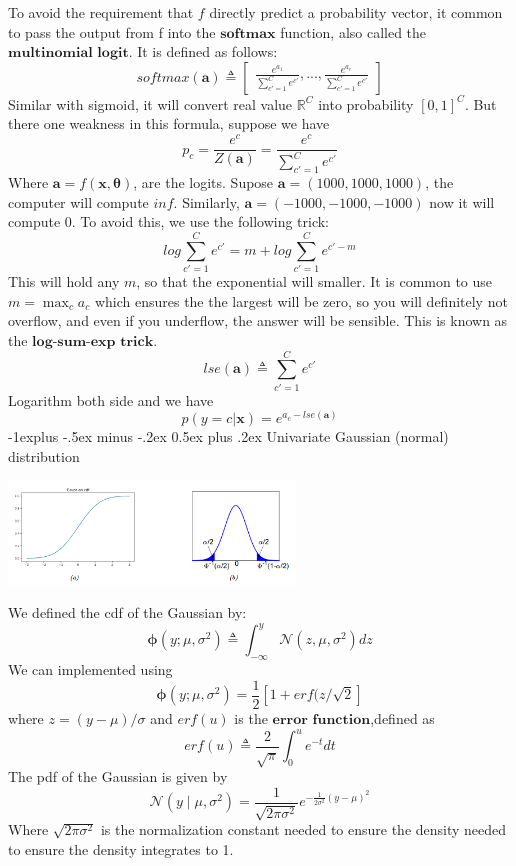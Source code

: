 \documentclass[10pt,landscape]{article}
\makeatletter
\newcommand{\inp}{\textbf{x}}
\newcommand{\parameter}{\boldsymbol{\theta}}
\newcommand{\R}{\mathbb{R}}
\newcommand{\variance}{\sigma^2}
\newcommand{\normal}{\mathcal{N}}
\renewcommand{\subsection}{\@startsection{subsection}{2}{0mm}%
                                {-1explus -.5ex minus -.2ex}%
                                {0.5ex plus .2ex}%
                                {\normalfont\normalsize\bfseries}}
\makeatother
\begin{document}
\begin{multicols*}{3}
To avoid the requirement that $f$ directly predict a probability vector, it common to pass the output from f into the $\textbf{softmax}$ function, also called the $\textbf{multinomial logit}$. It is defined as follows:
\[
    softmax(\mathbf{a})\triangleq
    \begin{bmatrix}
        \frac{e^{a_1}}{\sum_{c'=1}^{C}e^{c'}},...,
        \frac{e^{a_c}}{\sum_{c'=1}^{C}e^{c'}}
    \end{bmatrix}
\]
Similar with sigmoid, it will convert real value $\R^C$ into probability $[0,1]^C$.
But there one weakness in this formula, suppose we have
\[
    p_c=\frac{e^c}{Z(\mathbf{a})}=\frac{e^c}{\sum_{c'=1}^{C}e^{c'}}
\]
Where $\mathbf{a}=f(\inp,\parameter)$, are the logits.
Supose $\mathbf{a}=(1000,1000,1000)$, the computer will compute $inf$. Similarly, $\mathbf{a}=(-1000,-1000,-1000)$ now it will compute $0$. To avoid this, we use the following trick:
\[
    log\sum_{c'=1}^{C}e^{c'} = m +log\sum_{c'=1}^{C}e^{c'-m}
\]
This will hold any $m$, so that the exponential will smaller. It is common to use $m=\max_ca_c$ which ensures the the largest will be zero, so you will definitely not overflow, and even if you underflow, the answer will be sensible. This is known as the $\textbf{log-sum-exp trick}$.
\[
    lse(\mathbf{a})\triangleq \sum_{c'=1}^{C}e^{c'}
\]
Logarithm both side and we have
\[
    p(y=c|\inp)=e^{a_c-lse(\mathbf a)}
\]
\subsection{Univariate Gaussian (normal) distribution}
 \begin{minipage}{\linewidth}
    \centering
    \includegraphics[width=3in]{figures/gauss_plot.PNG}
\end{minipage}
We defined the cdf of the Gaussian by:
\[
    \boldsymbol{\phi}(y;\mu,\variance)\triangleq\int_{-\infty}^{y}\normal(z,\mu,\variance)dz
\]
We can implemented using 
\[
    \boldsymbol{\phi}(y;\mu,\variance)=\frac{1}{2}[1+erf(z/\sqrt{2}]
\]
where $z=(y-\mu)/\sigma$ and $erf(u)$ is the $\textbf{error function}$,defined as
\[
    erf(u)\triangleq\frac{2}{\sqrt{\pi}}\int_{0}^{u}e^{-t}dt
\]
The pdf of the Gaussian is given by
\[
    \normal(y\mid\mu,\variance)=\frac{1}{\sqrt{2\pi\variance}}e^{-\frac{{1}}{2\variance}(y-\mu)^2}
\]
Where $\sqrt{2\pi\variance}$ is the normalization constant needed to ensure the density needed to ensure the density integrates to 1.


\end{multicols*}
\end{document}
